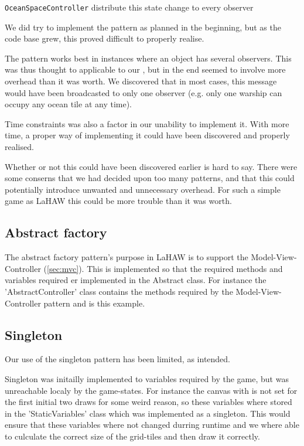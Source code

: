 \texttt{OceanSpaceController} distribute this state change to every observer

We did try to implement the pattern as planned in the beginning, but as the code base grew, this proved difficult to properly realise.

The pattern works best in instances where an object has several observers. This was thus thought to applicable to our 
, but in the end seemed to involve more overhead than it was worth. We discovered that in most cases, this message would have been broadcasted to only one observer (e.g. only one warship can occupy any ocean tile at any time).

Time constraints was also a factor in our unability to implement it. With more time, a proper way of implementing it could have been discovered and properly realised.

Whether or not this could have been discovered earlier is hard to say. There were some conserns that we had decided upon too many patterns, and that this could potentially introduce unwanted and unnecessary overhead. For such a simple game as LaHAW this could be more trouble than it was worth.



\subsection{Abstract factory}
\label{sec:absfac}
The abstract factory pattern's purpose in LaHAW is to support the Model-View-Controller (\ref{sec:mvc}). This is implemented so that the required methods and variables required er implemented in the Abstract class. For instance the 'AbstractController' class contains the methods required by the Model-View-Controller pattern and is this example.




\subsection{Singleton}
Our use of the singleton pattern has been limited, as intended.

Singleton was initailly implemented to variables required by the game, but was unreachable localy by the game-states.
For instance the canvas with is not set for the first initial two draws for some weird reason, so these variables where stored in the 'StaticVariables' class which was implemented as a singleton. This would ensure that these variables where not changed durring runtime and we where able to culculate the correct size of the grid-tiles and then draw it correctly.


